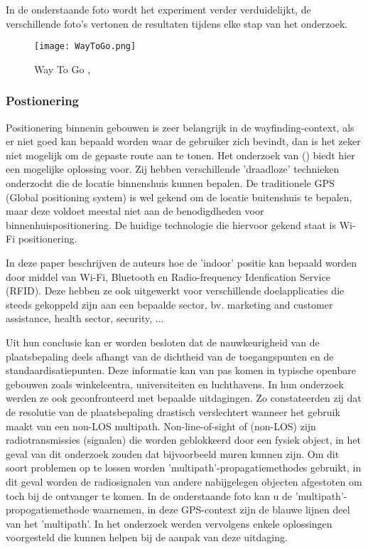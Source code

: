 In de onderstaande foto wordt het experiment verder verduidelijkt, de verschillende foto's vertonen de resultaten tijdens elke stap van het onderzoek.

\begin{figure}[H]
	\centering
	\texttt{[image: WayToGo.png]}
	\caption{Way To Go , \autocite{Haikun2017}}
\end{figure}

\subsubsection{Postionering}
Positionering binnenin gebouwen is zeer belangrijk in de wayfinding-context, als er niet goed kan bepaald worden waar de gebruiker zich bevindt, dan is het zeker niet mogelijk om de gepaste route aan te tonen. Het onderzoek van \textcite{Hasan2019} () biedt hier een mogelijke oplossing voor. Zij hebben verschillende 'draadloze' technieken onderzocht die de locatie binnenshuis kunnen bepalen. De traditionele GPS (Global positioning system) is wel gekend om de locatie buitenshuis te bepalen, maar deze voldoet meestal niet aan de benodigdheden voor binnenhuispositionering. De huidige technologie die hiervoor gekend staat is Wi-Fi positionering.

In deze paper beschrijven de auteurs hoe de 'indoor' positie kan bepaald worden door middel van Wi-Fi, Bluetooth en Radio-frequency Idenfication Service (RFID). Deze hebben ze ook uitgewerkt voor verschillende doelapplicaties die steeds gekoppeld zijn aan een bepaalde sector, bv. marketing and customer assistance, health sector, security, ...

Uit hun conclusie kan er worden besloten dat de nauwkeurigheid van de plaatsbepaling deels afhangt van de dichtheid van de toegangspunten en de standaardisatiepunten. Deze informatie kan van pas komen in typische openbare gebouwen zoals winkelcentra, universiteiten en luchthavens. In hun onderzoek werden ze ook geconfronteerd met bepaalde uitdagingen. Zo constateerden zij dat de resolutie van de plaatsbepaling drastisch verslechtert wanneer het gebruik maakt van een non-LOS multipath. Non-line-of-sight of (non-LOS) zijn radiotransmissies (signalen) die worden geblokkeerd door een fysiek object, in het geval van dit onderzoek zouden dat bijvoorbeeld muren kunnen zijn. Om dit soort problemen op te lossen worden 'multipath'-propagatiemethodes gebruikt, in dit geval worden de radiosignalen van andere nabijgelegen objecten afgestoten om toch bij de ontvanger te komen. In de onderstaande foto kan u de 'multipath'-propogatiemethode waarnemen, in deze GPS-context zijn de blauwe lijnen deel van het 'multipath'. In het onderzoek werden vervolgens enkele oplossingen voorgesteld die kunnen helpen bij de aanpak van deze uitdaging.

